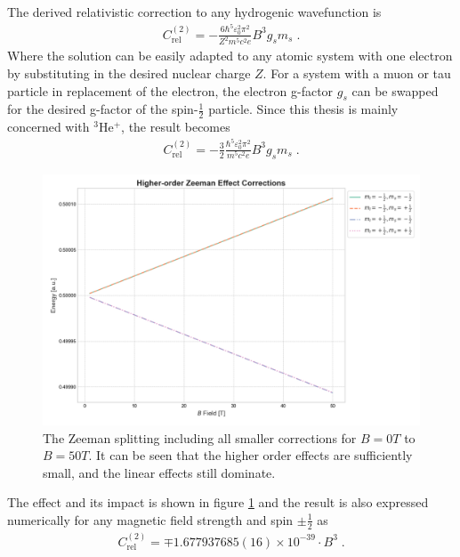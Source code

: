         \noindent The derived relativistic correction to any hydrogenic wavefunction is
        \begin{align}
            C_{\text{rel}}^{(2)} = - \frac{6\hbar^5 \varepsilon_0^2 \pi^2}{Z^2 m^5 c^2 e} B^3 g_s m_s\;.
        \end{align}
        \noindent Where the solution can be easily adapted to any atomic system with one electron by substituting in the desired nuclear charge $Z$. For a system with a muon or tau particle in replacement of the electron, the electron g-factor $g_s$ can be swapped for the desired g-factor of the spin-$\frac{1}{2}$ particle. Since this thesis is mainly concerned with $^3$He$^+$, the result becomes
        \begin{align}
            C_{\text{rel}}^{(2)} = - \frac{3}{2}\frac{\hbar^5 \varepsilon_0^2 \pi^2}{ m^5 c^2 e} B^3 g_s m_s\;.
        \end{align}
        \begin{figure}[h]
            \begin{center}
                \includegraphics[width=0.85\linewidth]{Zeeman_Graph.png}
                \caption{The Zeeman splitting including all smaller corrections for $B=0T$ to $B=50T$. It can be seen that the higher order effects are sufficiently small, and the linear effects still dominate.}\label{fig:d}
            \end{center}
        \end{figure}
        \noindent The effect and its impact is shown in figure \ref{fig:d} and the result is also expressed numerically for any magnetic field strength and spin $\pm \frac{1}{2}$ as
        \begin{align}
            C_{\text{rel}}^{(2)} = \mp 1.677937685(16)\times 10^{-39} \cdot B^3\;.
        \end{align}
